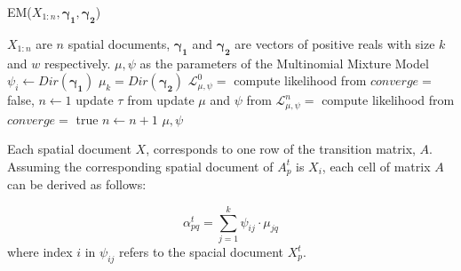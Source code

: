 \begin{algorithm}
\caption{EM($ X_{1:n}, \boldsymbol{\gamma_1}, \boldsymbol{\gamma_2}$)}
\label{algo:emalgo}
\begin{algorithmic}[1]
\REQUIRE $X_{1:n}$ are $n$ spatial documents, $\boldsymbol{\gamma_1}$ and $\boldsymbol{\gamma_2}$ are vectors of positive reals with size $k$ and $w$ respectively. 
\ENSURE $\mu, \psi$ as the parameters of the Multinomial Mixture Model
	\STATE $\psi_i \leftarrow Dir(\boldsymbol{\gamma_1})$\label{ln:psi}
\ENDFOR
{}
	\STATE $\mu_k = Dir(\boldsymbol{\gamma_2})$\label{ln:mu}
\ENDFOR
\STATE $\mathcal{L}_{\mu, \psi}^0 =$ compute likelihood from \label{ln:like1}
\STATE $converge=$ false, $n \leftarrow 1$
\label{ln:whiles}
	\STATE update $\tau$ from 
    \STATE update $\mu$ and $\psi$ from 
    \STATE $\mathcal{L}_{\mu, \psi}^n =$ compute likelihood from 
    	\STATE $converge =$ true
    \ENDIF
    \STATE $n \leftarrow n + 1$
\ENDWHILE \label{ln:whilee}
\RETURN $\mu, \psi$
\end{algorithmic}
\end{algorithm}

Each spatial document $X$, corresponds to one row of the transition matrix, $A$. Assuming the corresponding spatial document of $A_p^t$ is $X_i$, each cell of matrix $A$ can be derived as follows:

\begin{equation}
\alpha_{pq}^t = \sum_{j=1}^k \psi_{ij}\cdot\mu_{jq}
\end{equation}
where index $i$ in $\psi_{ij}$ refers to the spacial document $X_p^t$.